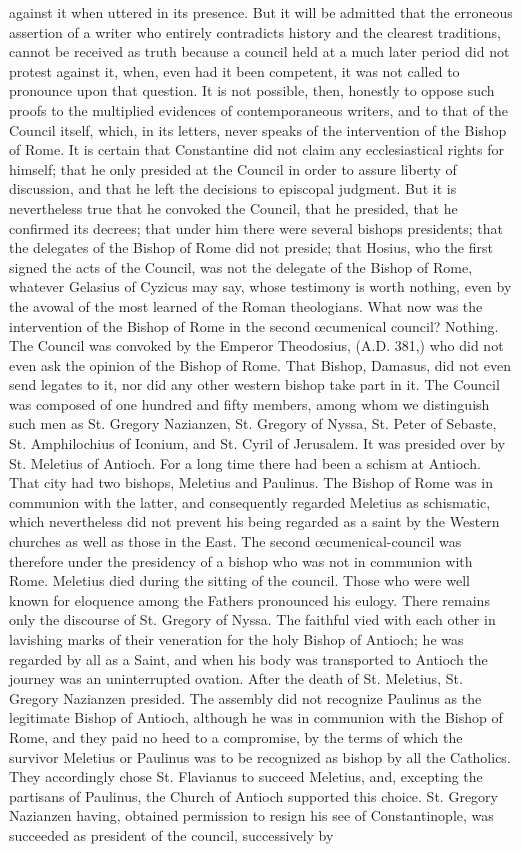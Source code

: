 against it when uttered in its presence. But it will be admitted that the erroneous assertion of a writer who entirely contradicts history and the clearest traditions, cannot be received as truth because a council held at a much later period did not protest against it, when, even had it been competent, it was not called to pronounce upon that question. It is not possible, then, honestly to oppose such proofs to the multiplied evidences of contemporaneous writers, and to that of the Council itself, which, in its letters, never speaks of the intervention of the Bishop of Rome. It is certain that Constantine did not claim any ecclesiastical rights for himself; that he only presided at the Council in order to assure liberty of discussion, and that he left the decisions to episcopal judgment. But it is nevertheless true that he convoked the Council, that he presided, that he confirmed its decrees; that under him there were several bishops presidents; that the delegates of the Bishop of Rome did not preside; that Hosius, who the first signed the acts of the Council, was not the delegate of the Bishop of Rome, whatever Gelasius of Cyzicus may say, whose testimony is worth nothing, even by the avowal of the most learned of the Roman theologians. What now was the intervention of the Bishop of Rome in the second œcumenical council? Nothing. The Council was convoked by the Emperor Theodosius, (A.D. 381,) who did not even ask the opinion of the Bishop of Rome. That Bishop, Damasus, did not even send legates to it, nor did any other western bishop take part in it. The Council was composed of one hundred and fifty members, among whom we distinguish such men as St. Gregory Nazianzen, St. Gregory of Nyssa, St. Peter of Sebaste, St. Amphilochius of Iconium, and St. Cyril of Jerusalem. It was presided over by St. Meletius of Antioch. For a long time there had been a schism at Antioch. That city had two bishops, Meletius and Paulinus. The Bishop of Rome was in communion with the latter, and consequently regarded Meletius as schismatic, which nevertheless did not prevent his being regarded as a saint by the Western churches as well as those in the East. The second œcumenical-council was therefore under the presidency of a bishop who was not in communion with Rome. Meletius died during the sitting of the council. Those who were well known for eloquence among the Fathers pronounced his eulogy. There remains only the discourse of St. Gregory of Nyssa. The faithful vied with each other in lavishing marks of their veneration for the holy Bishop of Antioch; he was regarded by all as a Saint, and when his body was transported to Antioch the journey was an uninterrupted ovation. After the death of St. Meletius, St. Gregory Nazianzen presided. The assembly did not recognize Paulinus as the legitimate Bishop of Antioch, although he was in communion with the Bishop of Rome, and they paid no heed to a compromise, by the terms of which the survivor Meletius or Paulinus was to be recognized as bishop by all the Catholics. They accordingly chose St. Flavianus to succeed Meletius, and, excepting the partisans of Paulinus, the Church of Antioch supported this choice. St. Gregory Nazianzen having, obtained permission to resign his see of Constantinople, was succeeded as president of the council, successively by 